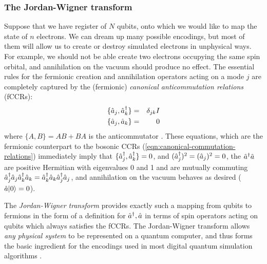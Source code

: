 \subsubsection{The Jordan-Wigner transform}
\label{sec:jordan-wigner}
Suppose that we have register of $N$ qubits, onto which we would like to map the state of $n$ electrons. We can dream up many possible encodings, but most of them will allow us to create or destroy simulated electrons in unphysical ways. For example, we should not be able create two electrons occupying the same spin orbital, and annihilation on the vacuum should produce no effect.  The essential rules for the fermionic creation and annihilation operators acting on a mode $j$ are completely captured  by the (fermionic) \emph{canonical anticommutation relations} (fCCRs):
\begin{eqnarray}
    \{ \hat{a}_j, \hat{a}^{\dagger}_k \}  &=& \delta_{jk}I \\
    \{ \hat{a}_j, \hat{a}_k \}  &=& 0
\end{eqnarray}
where $\{ A, B\} = AB+BA$ is the anticommutator \cite{Nielsen}. These equations, which are the fermionic counterpart to the bosonic CCRs (\ref{eqn:canonical-commutation-relations}) immediately imply that 
$\{\hat{a}^{\dagger}_j, \hat{a}^{\dagger}_k\}=0$, and $(\hat{a}^{\dagger}_j)^2 = (\hat{a}_j)^2 = 0$, the $\hat{a}^{\dagger} \hat{a}$ are positive Hermitian with eigenvalues 0 and 1 and are mutually commuting 
$\hat{a}^{\dagger}_j\hat{a}_j\hat{a}^{\dagger}_k\hat{a}_k = \hat{a}^{\dagger}_k\hat{a}_k\hat{a}^{\dagger}_j\hat{a}_j$, and annihilation on the vacuum behaves as desired ($\hat{a} \mbox{$ | 0 \rangle $} = 0$). 

The \emph{Jordan-Wigner transform} \cite{Jordan1928, Ortiz2001} provides exactly such a mapping from qubits to fermions in the form of a definition for $\hat{a}^{\dagger}, \hat{a}$ in terms of spin operators acting on qubits which always satisfies the fCCRs. The Jordan-Wigner transform allows \emph{any physical system} to be represented on a quantum computer, and thus forms the basic ingredient for the encodings used in most digital quantum simulation algorithms \cite{Somma2002, Abrams1997}. 

